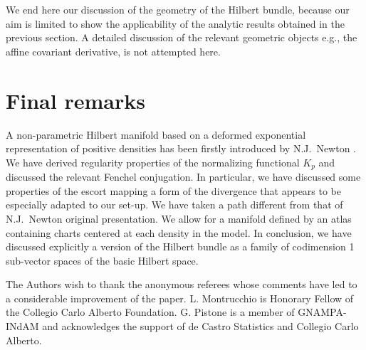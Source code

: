 \documentclass[graybox]{svmult}
\begin{document}
We end here our discussion of the geometry of the Hilbert bundle, because our aim is limited to show the applicability of the analytic results obtained in the previous section. A detailed discussion of the relevant geometric objects e.g., the affine covariant derivative, is not attempted here.

\section{Final remarks}
\label{sec:conclusions}
A non-parametric Hilbert manifold based on a deformed exponential representation of positive densities has been firstly introduced by N.J.~Newton \cite{newton:2012,newton:2016}. We have derived regularity properties of the normalizing functional $K_p$ and discussed the relevant Fenchel conjugation. In particular, we have discussed some properties of the escort mapping a form of the divergence that appears to be especially adapted to our set-up. We have taken a path different from that of N.J.~Newton original presentation. We allow for a manifold defined by an atlas containing charts centered at each density in the model. In conclusion, we have discussed explicitly a version of the Hilbert bundle as a family of codimension 1 sub-vector spaces of the basic Hilbert space.

\begin{acknowledgement}
The Authors wish to thank the anonymous referees whose comments have led to a considerable improvement of the paper. L. Montrucchio is Honorary Fellow of the Collegio Carlo Alberto Foundation. G. Pistone is a member of GNAMPA-INdAM and acknowledges the support of de Castro Statistics and Collegio Carlo Alberto.
\end{acknowledgement}

% 
% 
\end{document}
